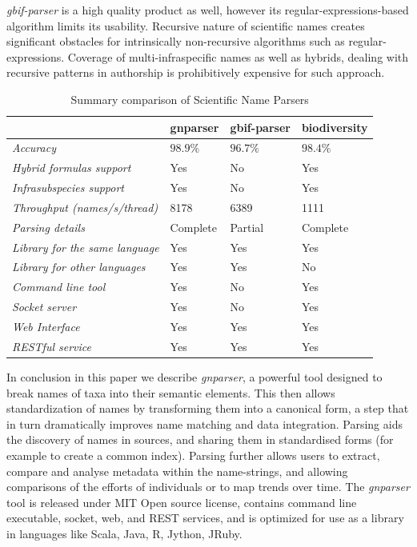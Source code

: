 \documentclass{bmcart}
\begin{document}
\textit{gbif-parser} is a high quality product as well, however its regular-expressions-based algorithm limits its usability. Recursive nature of scientific names creates significant obstacles for intrinsically non-recursive algorithms such as regular-expressions. Coverage of multi-infraspecific names as well as hybrids, dealing with recursive patterns in authorship is prohibitively expensive for such approach.

\begin{table}[htb]
  \begin{center}
    \caption{Summary comparison of Scientific Name Parsers}
    \label{table:summary}
    \resizebox{12.5cm}{!} {\begin{tabular}{|l|*{3}{l}|}
      \hline
                             & gnparser & gbif-parser & biodiversity \\
      \hline
      \textit{Accuracy}                     & $98.9\%$ & $96.7\%$ & $98.4\%$\\
      \textit{Hybrid formulas support}      & Yes      & No       & Yes     \\
      \textit{Infrasubspecies support}      & Yes      & No       & Yes     \\
      \textit{Throughput (names/s/thread)}  & 8178     & 6389     & 1111    \\
      \textit{Parsing details}              & Complete & Partial  & Complete\\
      \textit{Library for the same language}& Yes      & Yes      & Yes     \\
      \textit{Library for other languages}  & Yes      & Yes      & No      \\
      \textit{Command line tool}            & Yes      & No       & Yes     \\
      \textit{Socket server}                & Yes      & No       & Yes     \\
      \textit{Web Interface}                & Yes      & Yes      & Yes     \\
      \textit{RESTful service}              & Yes      & Yes      & Yes     \\
      \hline
    \end{tabular}
  }
  \end{center}
\end{table}




In conclusion in this paper we describe \textit{gnparser}, a powerful tool designed to break names of taxa into their semantic elements. This then allows standardization of names by transforming them into a canonical form, a step that in turn dramatically improves name matching and data integration. Parsing aids the discovery of names in sources, and sharing them in standardised forms (for example to create a common index). Parsing further allows users to extract, compare and analyse metadata within the name-strings, and allowing comparisons of the efforts of individuals or to map trends over time. The \textit{gnparser} tool is released under MIT Open source license, contains command line executable, socket, web, and REST services, and is optimized for use as a library in languages like Scala, Java, R, Jython, JRuby.
\end{document}
